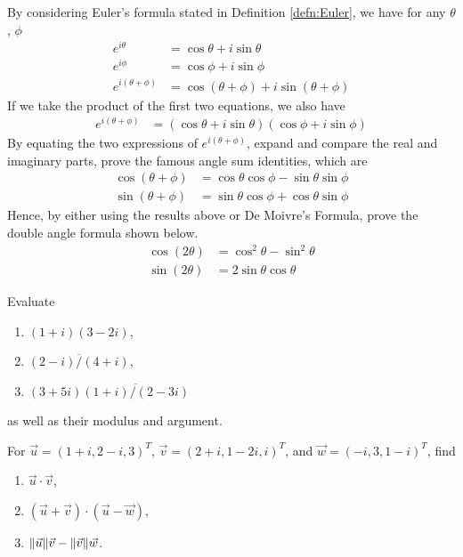 \begin{Exercise}
By considering Euler's formula stated in Definition \ref{defn:Euler}, we have for any $\theta$, $\phi$
\begin{align*}
e^{i \theta} &= \cos \theta + i \sin \theta \\
e^{i \phi} &= \cos \phi + i \sin \phi \\
e^{i (\theta+\phi)} &= \cos (\theta+\phi) + i \sin (\theta+\phi)
\end{align*}
If we take the product of the first two equations, we also have
\begin{align*}
e^{i (\theta+\phi)} &= (\cos \theta + i \sin \theta)(\cos \phi + i \sin \phi)
\end{align*}
By equating the two expressions of $e^{i (\theta+\phi)}$, expand and compare the real and imaginary parts, prove the famous angle sum identities, which are
\begin{align*}
\cos(\theta+\phi) &= \cos\theta \cos\phi - \sin\theta \sin\phi \\
\sin(\theta+\phi) &= \sin\theta \cos\phi + \cos\theta \sin\phi 
\end{align*}
Hence, by either using the results above or De Moivre's Formula, prove the double angle formula shown below.
\begin{align*}
\cos(2\theta) &= \cos^2\theta - \sin^2\theta \\
\sin(2\theta) &= 2\sin\theta \cos\theta  
\end{align*}
\end{Exercise}

\begin{Exercise}
Evaluate
\begin{enumerate}[label=(\alph*)]
\item $(1+i)(3-2i)$,
\item $\overline{(2-i)/(4+i)}$,
\item $(3+5i)\overline{(1+i)/(2-3i)}$
\end{enumerate}
as well as their modulus and argument.
\end{Exercise}

\begin{Exercise}
For $\vec{u} = (1+i, 2-i, 3)^T$, $\vec{v} = (2+i, 1-2i, i)^T$, and $\vec{w} = (-i, 3, 1-i)^T$, find
\begin{enumerate}[label=(\alph*)]
\item $\vec{u} \cdot \vec{v}$,
\item $(\vec{u} + \vec{v}) \cdot (\vec{u} - \vec{w})$,
\item $\norm{\vec{u}} \vec{v} - \norm{\vec{v}} \vec{w}$.
\end{enumerate}
\end{Exercise}


